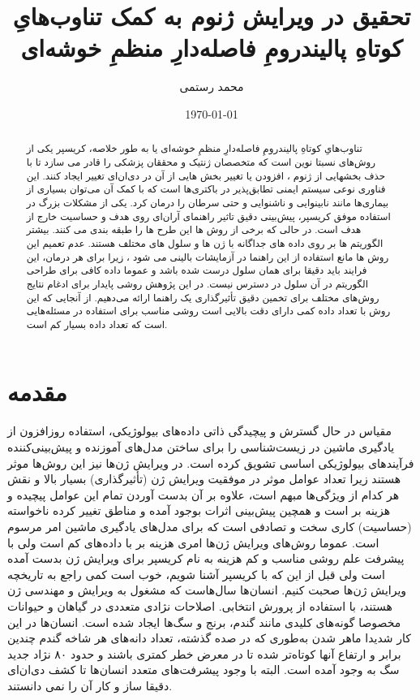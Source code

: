 \documentclass[12pt,a4paper,BCOR=.7cm,headsepline,bibliography=totoc]{report}
\title{تحقیق در ویرایش ژنوم به کمک تناوب‌هایِ کوتاهِ پالیندرومِ فاصله‌دارِ منظمِ خوشه‌ای}
\author{محمد رستمی }
\date{\today}
\begin{document}
\makethesistitle
{}
\begin{abstract}
تناوب‌هایِ کوتاهِ پالیندرومِ فاصله‌دارِ منظمِ خوشه‌ای یا به طور خلاصه، کریسپر  یکی از روش‌های نسبتا نوین است که متخصصان ژنتیک و محققان پزشکی را قادر می سازد تا با حذف بخشهایی از ژنوم ،
افزودن یا تغییر بخش هایی از آن در دی‌ان‌ای  تغییر ایجاد کنند. این فناوری نوعی سیستم ایمنی تطابق‌پذیر در باکتری‌ها است که با کمک آن می‌توان بسیاری از بیماری‌ها مانند نابینوایی و ناشنوایی و حتی سرطان را درمان کرد. یکی از مشکلات بزرگ در استفاده موفق کریسپر، پیش‌بینی دقیق تاثیر راهنمای آر‌ان‌ای  روی هدف و حساسیت خارج از هدف است. در حالی که برخی از روش ها این طرح ها را طبقه بندی می کنند. بیشتر
الگوریتم ها بر روی داده های جداگانه با ژن ها و سلول های مختلف هستند. عدم تعمیم این روش ها
مانع استفاده از این راهنما در آزمایشات بالینی می شود ، زیرا برای هر درمان، این فرایند باید دقیقا برای همان سلول درست شده باشد و عموما داده کافی برای طراحی الگوریتم در آن سلول در دسترس نیست. در این پژوهش روشی پایدار برای ادغام نتایج روش‌های مختلف برای تخمین دقیق تأثیرگذاری یک راهنما ارائه می‌دهیم. از آنجایی که این روش با تعداد داده کمی دارای دقت بالایی است روشی مناسب برای استفاده در مسئله‌هایی است که تعداد داده بسیار کم است.
\end{abstract}
\pagestyle{plain}

\tableofcontents{} \listoffigures{}
\chapter{مقدمه}
\pagestyle{fancy} 
مقیاس در حال گسترش و پیچیدگی ذاتی داده‌های بیولوژیکی، استفاده روزافزون از یادگیری ماشین در زیست‌شناسی را برای ساختن مدل‌های آموزنده و پیش‌بینی‌کننده فرآیندهای بیولوژیکی اساسی تشویق کرده است. در ویرایش ژن‌ها نیز این روش‌ها موثر هستند زیرا تعداد عوامل موثر در موفقیت ویرایش ژن (تأثیرگذاری) بسیار بالا و نقش هر کدام از ویژگی‌ها مبهم است، علاوه بر آن بدست آوردن تمام این عوامل پیچیده و هزینه بر است و همچین پیش‌بینی اثرات بوجود آمده و مناطق تغییر کرده ناخواسته (حساسیت) کاری سخت و تصادفی است که برای مدل‌های یادگیری ماشین امر مرسوم است. عموما روش‌های ویرایش ژن‌ها امری هزینه بر با داده‌های کم است ولی با پیشرفت علم روشی مناسب و کم هزینه به نام کریسپر برای ویرایش ژن بدست آمده است ولی قبل از این که با کریسپر آشنا شویم، خوب است کمی راجع به تاریخچه ویرایش ژن‌ها صحبت کنیم. انسان‌ها سال‌هاست که مشغول به ویرایش و مهندسی ژن هستند، با استفاده از پرورش انتخابی.
	اصلاحات نژادی متعددی در گیاهان و حیوانات مخصوصا گونه‌های کلیدی مانند گندم، برنج و سگ‌ها ایجاد شده است. انسان‌ها در این کار شدیدا ماهر شدن به‌طوری که در صده گذشته، تعداد دانه‌های هر شاخه گندم چندین برابر و ارتفاع آنها کوتاه‌تر شده تا در معرض خطر کمتری باشند و حدود ۸۰ نژاد جدید سگ به وجود آمده است. البته با وجود پیشرفت‌های متعدد انسان‌ها تا کشف دی‌ان‌ای دقیقا ساز و کار آن را نمی دانستند. 
	
\end{document}
